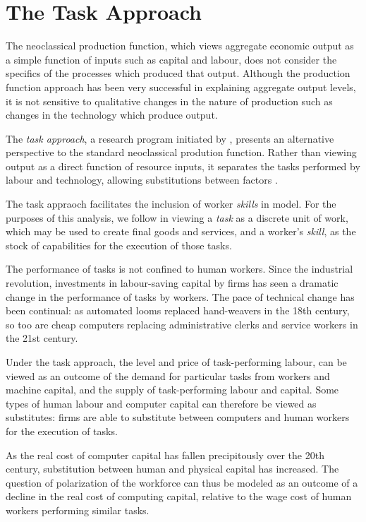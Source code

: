 \section{The Task Approach}

The neoclassical production function, which views aggregate economic output as a simple function of inputs such as capital and labour, does not consider the specifics of the processes which produced that output. Although the production function approach has been very successful in explaining aggregate output levels, it is not sensitive to qualitative changes in the nature of production such as changes in the technology which produce output.


The {\em task approach}, a research program initiated by \citet{Levy2003}, presents an alternative perspective to the standard neoclassical prodution function. Rather than viewing output as a direct function of resource inputs, it separates the tasks performed by labour and technology, allowing substitutions between factors \citep{Autor2013}.

The task appraoch facilitates the inclusion of worker \emph{skills} in model. For the purposes of this analysis, we follow \citet{Autor2013} in viewing a \emph{task} as a discrete unit of work, which may be used to create final goods and services, and a worker's \emph{skill}, as the stock of capabilities for the execution of those tasks. 

The performance of tasks is not confined to human workers. Since the industrial revolution, investments in labour-saving capital by firms has seen a dramatic change in the performance of tasks by workers. The pace of technical change has been continual: as automated looms replaced hand-weavers in the 18th century, so too are cheap computers replacing administrative clerks and service workers in the 21st century.

Under the task approach, the level and price of task-performing labour, can be 
viewed as an outcome of the demand for particular tasks from workers and machine capital, and the supply of task-performing labour and capital. Some types of human labour and computer capital can therefore be viewed as substitutes: firms are able to substitute between computers and human workers for the execution of tasks. 

As the real cost of computer capital has fallen precipitously over the 20th century, substitution between human and physical capital has increased. The question of polarization of the workforce can thus be modeled as an outcome of a decline in the real cost of computing capital, relative to the wage cost of human workers performing similar tasks.


